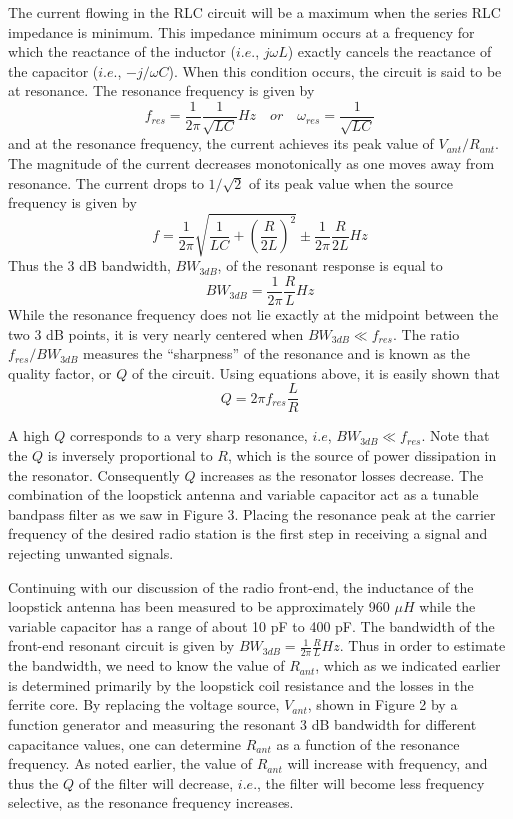 \documentclass [utf8] {article}
\begin{document}
{	The current flowing in the RLC circuit will be a maximum when the series RLC impedance is minimum. This impedance minimum occurs at a frequency for which the reactance of the inductor ($i.e.$, $j\omega L$) exactly cancels the reactance of the capacitor ($i.e.$, $−j/\omega C$). When this condition occurs, the circuit is said to be at resonance. The resonance frequency is given by
	$$f_{res} = \frac{1}{2\pi}\frac{1}{\sqrt{LC}}Hz \quad or \quad \omega_{res} = \frac{1}{\sqrt{LC}}$$
	and at the resonance frequency, the current achieves its peak value of $V_{ant}/R_{ant}$. The magnitude of the current decreases monotonically as one moves away from resonance. The current drops to $1/\sqrt{2}$ of its peak value when the source frequency is given by
	$$ f = \frac{1}{2\pi}\sqrt{\frac{1}{LC}+(\frac{R}{2L})^2} \pm \frac{1}{2\pi}\frac{R}{2L} Hz$$
	Thus the 3 dB bandwidth, $BW_{3dB}$, of the resonant response is equal to
	$$BW_{3dB} = \frac{1}{2\pi}\frac{R}{L}Hz$$
	While the resonance frequency does not lie exactly at the midpoint between the two 3 dB points, it is very nearly centered when $BW_{3dB}\ll f_{res}$.
	The ratio $f_{res}/BW_{3dB}$ measures the “sharpness” of the resonance and is known as the quality factor, or $Q$ of the circuit. Using equations above, it is easily shown that
	$$Q = 2\pi f_{res}\frac{L}{R}$$

	A high $Q$ corresponds to a very sharp resonance, $i.e$, $BW_{3dB}\ll f_{res}$. Note that the $Q$ is inversely proportional to $R$, which is the source of power dissipation in the resonator. Consequently $Q$ increases as the resonator losses decrease. The combination of the loopstick antenna and variable capacitor act as a tunable bandpass filter as we saw in Figure 3. Placing the resonance peak at the carrier frequency of the desired radio station is the first step in receiving a signal and rejecting unwanted signals.

	Continuing with our discussion of the radio front-end, the inductance of the loopstick antenna has been measured to be approximately 960 $\mu H$ while the variable capacitor has a range of about 10 pF to 400 pF. The bandwidth of the front-end resonant circuit is given by $BW_{3dB} = \frac{1}{2\pi}\frac{R}{L}Hz$. Thus in order to estimate the bandwidth, we need to know the value of $R_{ant}$, which as we indicated earlier is determined primarily by the loopstick coil resistance and the losses in the ferrite core. By replacing the voltage source, $V_{ant}$, shown in Figure 2 by a function generator and measuring the resonant 3 dB bandwidth for different capacitance values, one can determine $R_{ant}$ as a function of the resonance frequency. As noted earlier, the value of $R_{ant}$ will increase with frequency, and thus the $Q$ of the filter will decrease, $i.e.$, the filter will become less frequency selective, as the resonance frequency increases.

}
\end{document}
